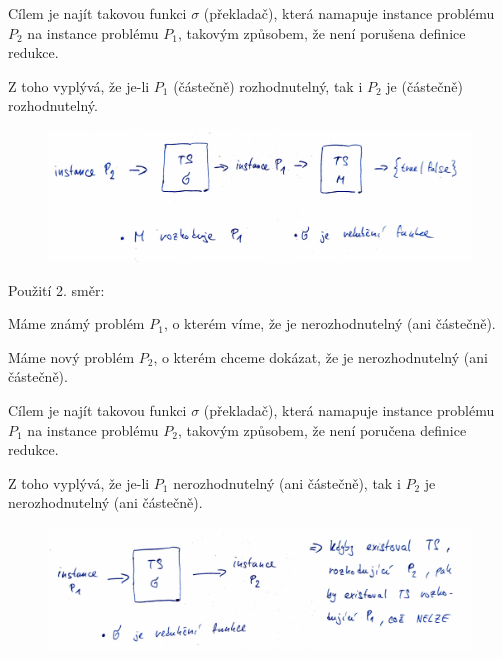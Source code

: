 \begin{compactitem}
\begin{compactitem}
        \item Cílem je najít takovou funkci $\sigma$ (překladač), která namapuje instance problému $P_2$ na instance problému $P_1$, takovým způsobem, že není porušena definice redukce.

        \item Z toho vyplývá, že je-li $P_1$ (částečně) rozhodnutelný, tak i $P_2$ je (částečně) rozhodnutelný.
    \end{compactitem}

    \begin{figure}[H]
        \centering
        \includegraphics[width=1\linewidth]{redukce_1.pdf}
    \end{figure}

    \item Použití 2. směr: \begin{compactitem}
        \item Máme známý problém $P_1$, o kterém víme, že je nerozhodnutelný (ani částečně).

        \item Máme nový problém $P_2$, o kterém chceme dokázat, že je nerozhodnutelný (ani částečně).

        \item Cílem je najít takovou funkci $\sigma$ (překladač), která namapuje instance problému $P_1$ na instance problému $P_2$, takovým způsobem, že není poručena definice redukce.

        \item Z toho vyplývá, že je-li $P_1$ nerozhodnutelný (ani částečně), tak i $P_2$ je nerozhodnutelný (ani částečně).
    \end{compactitem}

    \begin{figure}[H]
        \centering
        \includegraphics[width=1\linewidth]{redukce_2.pdf}
    \end{figure}

\end{compactitem}

